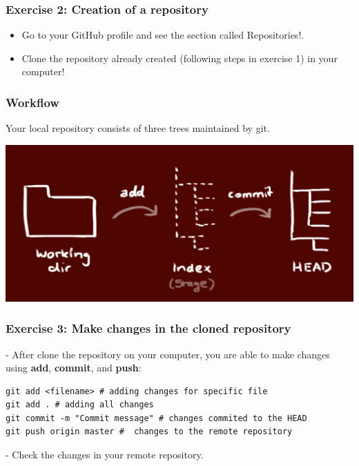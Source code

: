 \documentclass[svgnames]{beamer}
\begin{document}
\begin{frame}
\frametitle{Exercise 2: Creation of a repository}

\begin{itemize}
     \item Go to your GitHub profile and see the section called Repositories!.
    \item Clone the repository already created (following steps in exercise 1) in your computer!
\end{itemize}
\end{frame}

\begin{frame}[fragile]
\frametitle{Workflow}

Your local repository consists of three trees maintained by git.

\vspace{1em}
\begin{center}
\includegraphics[scale=0.25]{img/workflow.png}
\end{center}
\end{frame}


\begin{frame}[fragile]
\frametitle{Exercise 3: Make changes in the cloned repository}

- After clone the repository on your computer, you are able to make changes using \textbf{add}, \textbf{commit}, and \textbf{push}:

\begin{lstlisting}
git add <filename> # adding changes for specific file
git add . # adding all changes
git commit -m "Commit message" # changes commited to the HEAD
git push origin master #  changes to the remote repository
\end{lstlisting}

- Check the changes in your remote repository.

\end{frame}
\end{document}
